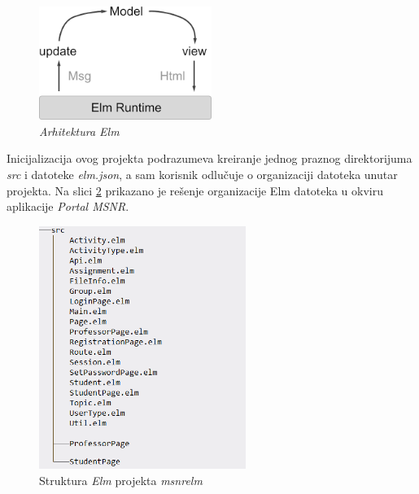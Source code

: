 \documentclass[12pt,oneside]{memoir}
\begin{document}
\begin{figure}[!ht]
  \centering
  \includegraphics[width=0.5\textwidth]{elmprog.png}
  \caption{\emph{Arhitektura Elm} \cite{rad}}
  \label{fig:elm-prog}
\end{figure}


\par Inicijalizacija ovog projekta podrazumeva kreiranje jednog praznog direktorijuma \emph{src} i datoteke \emph{elm.json}, a sam korisnik odlučuje o organizaciji datoteka unutar projekta. Na slici \ref{fig:msnrelm} prikazano je rešenje organizacije Elm datoteka u okviru aplikacije \emph{Portal MSNR}. 


\begin{figure}[!ht]
  \centering
  \includegraphics[width=0.6\textwidth]{msnr-elm.png}
  \caption{Struktura \emph{Elm} projekta \emph{msnr{\textunderscore}elm} \cite{rad}}
  \label{fig:msnrelm}
\end{figure}
\end{document}
